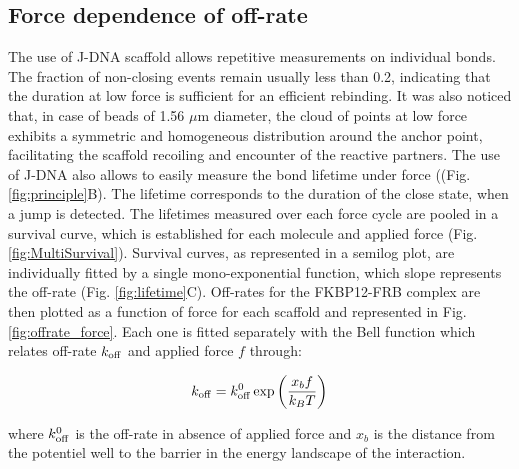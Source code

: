 \documentclass{biophys-new}
\begin{document}
\subsection*{Force dependence of off-rate}

The use of J-DNA scaffold allows repetitive measurements on individual bonds.
The fraction of non-closing events remain usually less than 0.2,  %
indicating that the duration at low force is sufficient for an efficient rebinding. It was also noticed that, in case of beads of 1.56 $\mu$m diameter, the cloud of points at low force exhibits a symmetric and homogeneous distribution around the anchor point, facilitating the scaffold recoiling and encounter of the reactive partners. The use of J-DNA also allows to easily measure the bond lifetime under force ((Fig. \ref{fig:principle}B). The lifetime
corresponds to the duration of the close state, when a jump is detected. %
The lifetimes measured over each force cycle are pooled in a survival curve, which is established for each molecule and applied force (Fig. \ref{fig:MultiSurvival}). Survival curves, as represented in a semilog plot, are individually fitted by a single mono-exponential function, which slope represents the off-rate (Fig. \ref{fig:lifetime}C). Off-rates for the FKBP12-FRB complex are then plotted as a function of force for each scaffold and represented in Fig. \ref{fig:offrate_force}. Each one is fitted separately with the Bell function which relates off-rate $ k_{\rm off}$ and applied force $f$ through:

\begin{equation}
\label{eq:Bell}
k_{\rm off} = k^0_{\rm off} \exp \left(\frac{x_b f}{k_B T}\right)
\end{equation}

\noindent where $k^0_{\rm off}$ is the off-rate in absence of applied force and $x_b$ is the distance from the potentiel well to the barrier in the energy landscape of the interaction.
\end{document}
